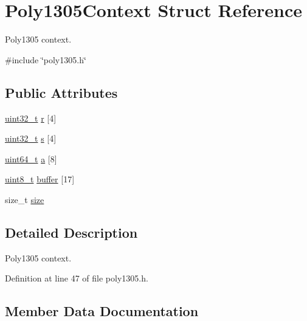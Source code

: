 \hypertarget{structPoly1305Context}{}\section{Poly1305\+Context Struct Reference}
\label{structPoly1305Context}


Poly1305 context.  




{\ttfamily \#include \char`\"{}poly1305.\+h\char`\"{}}

\subsection*{Public Attributes}
\begin{DoxyCompactItemize}
\item 
\hyperlink{stdint_8h_a435d1572bf3f880d55459d9805097f62}{uint32\+\_\+t} \hyperlink{structPoly1305Context_a7194202b23c39cda66f4feae4689895e}{r} \mbox{[}4\mbox{]}
\item 
\hyperlink{stdint_8h_a435d1572bf3f880d55459d9805097f62}{uint32\+\_\+t} \hyperlink{structPoly1305Context_a01116bfecf43bff20e0bedd9368851a2}{s} \mbox{[}4\mbox{]}
\item 
\hyperlink{stdint_8h_aec6fcb673ff035718c238c8c9d544c47}{uint64\+\_\+t} \hyperlink{structPoly1305Context_a95f600b1ce1dd03fecac15eda1d7b6e5}{a} \mbox{[}8\mbox{]}
\item 
\hyperlink{stdint_8h_aba7bc1797add20fe3efdf37ced1182c5}{uint8\+\_\+t} \hyperlink{structPoly1305Context_a91d2142b82af28b80579e63ab1f9f2b3}{buffer} \mbox{[}17\mbox{]}
\item 
size\+\_\+t \hyperlink{structPoly1305Context_a5e026316dee7aa495f38d3db5331ab20}{size}
\end{DoxyCompactItemize}


\subsection{Detailed Description}
Poly1305 context. 

Definition at line 47 of file poly1305.\+h.



\subsection{Member Data Documentation}
\mbox{\label{structPoly1305Context_a95f600b1ce1dd03fecac15eda1d7b6e5}} 
